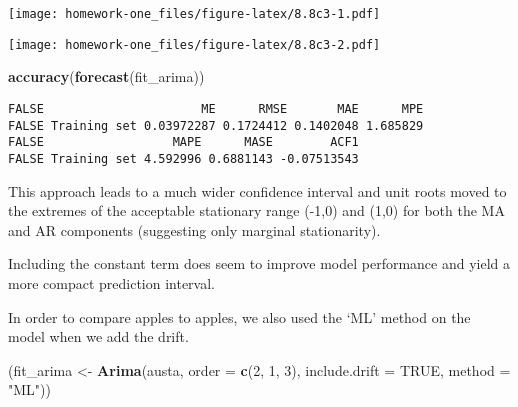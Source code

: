 \documentclass[openany]{book}
\newenvironment{Shaded}{\begin{snugshade}}{\end{snugshade}}
\newcommand{\DataTypeTok}[1]{\textcolor[rgb]{0.13,0.29,0.53}{#1}}
\newcommand{\DecValTok}[1]{\textcolor[rgb]{0.00,0.00,0.81}{#1}}
\newcommand{\KeywordTok}[1]{\textcolor[rgb]{0.13,0.29,0.53}{\textbf{#1}}}
\newcommand{\NormalTok}[1]{#1}
\newcommand{\OperatorTok}[1]{\textcolor[rgb]{0.81,0.36,0.00}{\textbf{#1}}}
\newcommand{\OtherTok}[1]{\textcolor[rgb]{0.56,0.35,0.01}{#1}}
\newcommand{\StringTok}[1]{\textcolor[rgb]{0.31,0.60,0.02}{#1}}
\begin{document}
\texttt{[image: homework-one\_files/figure-latex/8.8c3-1.pdf]}

\begin{Shaded}
\end{Shaded}

\texttt{[image: homework-one\_files/figure-latex/8.8c3-2.pdf]}

\begin{Shaded}
\begin{Highlighting}[]
\KeywordTok{accuracy}\NormalTok{(}\KeywordTok{forecast}\NormalTok{(fit_arima))}
\end{Highlighting}
\end{Shaded}

\begin{verbatim}
FALSE                      ME      RMSE       MAE      MPE
FALSE Training set 0.03972287 0.1724412 0.1402048 1.685829
FALSE                  MAPE      MASE        ACF1
FALSE Training set 4.592996 0.6881143 -0.07513543
\end{verbatim}

This approach leads to a much wider confidence interval and unit roots moved to the extremes of the acceptable stationary range (-1,0) and (1,0) for both the MA and AR components (suggesting only marginal stationarity).

Including the constant term does seem to improve model performance and yield a more compact prediction interval.

In order to compare apples to apples, we also used the `ML' method on the model when we add the drift.

\begin{Shaded}
\begin{Highlighting}[]
\NormalTok{(fit_arima <-}\StringTok{ }\KeywordTok{Arima}\NormalTok{(austa, }\DataTypeTok{order =} \KeywordTok{c}\NormalTok{(}\DecValTok{2}\NormalTok{, }\DecValTok{1}\NormalTok{, }\DecValTok{3}\NormalTok{), }\DataTypeTok{include.drift =} \OtherTok{TRUE}\NormalTok{, }
  \DataTypeTok{method =} \StringTok{"ML"}\NormalTok{))}
\end{Highlighting}
\end{Shaded}
\end{document}
